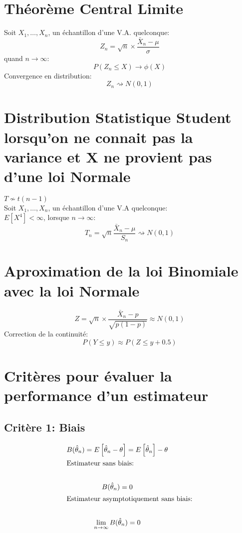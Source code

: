 \section{Théorème Central Limite}\label{stats:tcl}

Soit \(X_1,\dots,X_n\), un échantillon d'une V.A. quelconque: \[
Z_n=\sqrt{n}\times\frac{\bar{X}_n-\mu}{\sigma}
\] quand \(n \to \infty\): \[
P(Z_n\le X)\to\phi(X)
\] Convergence en distribution: \[
Z_n\rightsquigarrow N(0,1)
\]

\section{Distribution Statistique Student lorsqu'on ne connait pas la variance et X ne provient pas d'une loi Normale}\label{distribution-statistique-student-lorsquon-ne-connait-pas-la-variance-et-x-ne-provient-pas-dune-loi-normale}

\(T \not\sim t(n-1)\)\\
Soit \(X_1,\dots,X_n\), un échantillon d'une V.A quelconque:\\
\(E[X^4]<\infty\), lorsque \(n\to\infty\): \[
T_n = \sqrt{n}\frac{\bar{X}_n-\mu}{S_n}\rightsquigarrow N(0,1)
\]

\section{Aproximation de la loi Binomiale avec la loi Normale}\label{aproximation-de-la-loi-binomiale-avec-la-loi-normale}

\[
Z=\sqrt{n}\times \frac{\bar{X}_n-p}{\sqrt{p(1-p)}}\approx N(0,1)
\] Correction de la continuité: \[
P(Y\le y)\approx P(Z \le y+0.5 )
\]

\section{Critères pour évaluer la performance d'un estimateur}\label{stats:criteres}

\subsection{Critère 1: Biais}\label{stats:criteres:biais}

\begin{gather*}
B(\hat{\theta}_n)= E\left[\hat{\theta}_n-\theta\right]=E\left[\hat{\theta}_n\right]-\theta\\
\intertext{Estimateur sans biais:}\\
B(\hat{\theta}_n)=0\\
\intertext{Estimateur asymptotiquement sans biais:}\\
\lim_{n\to \infty} B(\hat{\theta}_n)=0
\end{gather*}

